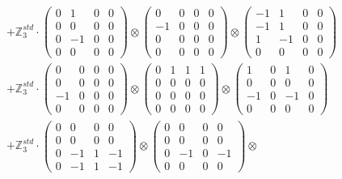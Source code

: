 \documentclass{article}
\begin{document}
{\begin{align}
        &+ \label{Rs16-Rc11-Solution-17-c22} \mathbb{Z}_3^{std} \cdot 
            \begin{pmatrix} 0 & 1 & 0 & 0 \\ 0 & 0 & 0 & 0 \\ 0 & -1 & 0 & 0 \\ 0 & 0 & 0 & 0 \end{pmatrix} \otimes 
            \begin{pmatrix} 0 & 0 & 0 & 0 \\ -1 & 0 & 0 & 0 \\ 0 & 0 & 0 & 0 \\ 0 & 0 & 0 & 0 \end{pmatrix} \otimes 
            \begin{pmatrix} -1 & 1 & 0 & 0 \\ -1 & 1 & 0 & 0 \\ 1 & -1 & 0 & 0 \\ 0 & 0 & 0 & 0 \end{pmatrix} \\ 
        &+ \label{Rs16-Rc11-Solution-17-c23} \mathbb{Z}_3^{std} \cdot 
            \begin{pmatrix} 0 & 0 & 0 & 0 \\ 0 & 0 & 0 & 0 \\ -1 & 0 & 0 & 0 \\ 0 & 0 & 0 & 0 \end{pmatrix} \otimes 
            \begin{pmatrix} 0 & 1 & 1 & 1 \\ 0 & 0 & 0 & 0 \\ 0 & 0 & 0 & 0 \\ 0 & 0 & 0 & 0 \end{pmatrix} \otimes 
            \begin{pmatrix} 1 & 0 & 1 & 0 \\ 0 & 0 & 0 & 0 \\ -1 & 0 & -1 & 0 \\ 0 & 0 & 0 & 0 \end{pmatrix} \\ 
        &+ \label{Rs16-Rc11-Solution-17-c24} \mathbb{Z}_3^{std} \cdot 
            \begin{pmatrix} 0 & 0 & 0 & 0 \\ 0 & 0 & 0 & 0 \\ 0 & -1 & 1 & -1 \\ 0 & -1 & 1 & -1 \end{pmatrix} \otimes 
            \begin{pmatrix} 0 & 0 & 0 & 0 \\ 0 & 0 & 0 & 0 \\ 0 & -1 & 0 & -1 \\ 0 & 0 & 0 & 0 \end{pmatrix} \otimes 

\end{align}}
\end{document}
